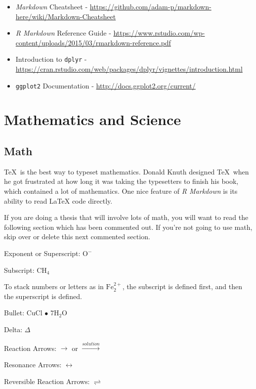 \documentclass[print]{nuthesis}
\begin{document}
\begin{itemize}
\item
  \emph{Markdown} Cheatsheet - \url{https://github.com/adam-p/markdown-here/wiki/Markdown-Cheatsheet}
\item
  \emph{R Markdown} Reference Guide - \url{https://www.rstudio.com/wp-content/uploads/2015/03/rmarkdown-reference.pdf}
\item
  Introduction to \texttt{dplyr} - \url{https://cran.rstudio.com/web/packages/dplyr/vignettes/introduction.html}
\item
  \texttt{ggplot2} Documentation - \url{http://docs.ggplot2.org/current/}
\end{itemize}

\hypertarget{math-sci}{%
\chapter{Mathematics and Science}\label{math-sci}}

\hypertarget{math}{%
\section{Math}\label{math}}

\TeX~is the best way to typeset mathematics. Donald Knuth designed \TeX~when he got frustrated at how long it was taking the typesetters to finish his book, which contained a lot of mathematics. One nice feature of \emph{R Markdown} is its ability to read LaTeX code directly.

If you are doing a thesis that will involve lots of math, you will want to read the following section which has been commented out. If you're not going to use math, skip over or delete this next commented section.

\noindent Exponent or Superscript: \(\mathrm{O^-}\)

\noindent Subscript: \(\mathrm{CH_4}\)

To stack numbers or letters as in \(\mathrm{Fe_2^{2+}}\), the subscript is defined first, and then the superscript is defined.

\noindent Bullet: CuCl \(\bullet\) \(\mathrm{7H_{2}O}\)

\noindent Delta: \(\Delta\)

\noindent Reaction Arrows: \(\longrightarrow\) or \(\xrightarrow{solution}\)

\noindent Resonance Arrows: \(\leftrightarrow\)

\noindent Reversible Reaction Arrows: \(\rightleftharpoons\)
\end{document}
